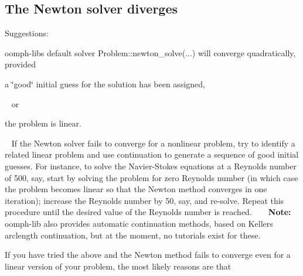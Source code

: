 \hypertarget{index_newton_divergence}{}\subsection{The Newton solver diverges}\label{index_newton_divergence}
Suggestions\+:
\begin{DoxyItemize}
\item {\ttfamily oomph-\/lib\textquotesingle{}s} default solver {\ttfamily Problem\+::newton\+\_\+solve}(...) will converge quadratically, provided ~\newline
~\newline

\begin{DoxyItemize}
\item a \char`\"{}good\char`\"{} initial guess for the solution has been assigned,
\end{DoxyItemize}~\newline
 or ~\newline

\begin{DoxyItemize}
\item the problem is linear.
\end{DoxyItemize}~\newline
 If the Newton solver fails to converge for a nonlinear problem, try to identify a related linear problem and use continuation to generate a sequence of good initial guesses. For instance, to solve the Navier-\/\+Stokes equations at a Reynolds number of 500, say, start by solving the problem for zero Reynolds number (in which case the problem becomes linear so that the Newton method converges in one iteration); increase the Reynolds number by 50, say, and re-\/solve. Repeat this procedure until the desired value of the Reynolds number is reached. ~\newline
~\newline
 {\bfseries Note\+:} {\ttfamily oomph-\/lib} also provides automatic continuation methods, based on Keller\textquotesingle{}s arclength continuation, but at the moment, no tutorials exist for these. ~\newline
~\newline

\item If you have tried the above and the Newton method fails to converge even for a linear version of your problem, the most likely reasons are that ~\newline
~\newline


\end{DoxyItemize}
